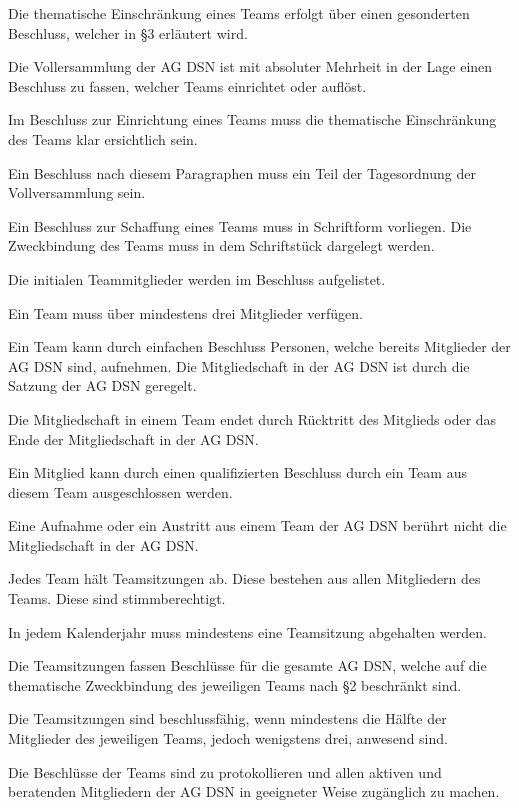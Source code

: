 \documentclass[draft,parskip=half-,DIV=12,mpinclude]{scrartcl}
\begin{document}
\begin{contract}
Die thematische Einschränkung eines Teams erfolgt über einen gesonderten Beschluss, welcher in §3 erläutert wird.


Die Vollersammlung der AG DSN ist mit absoluter Mehrheit in der Lage einen Beschluss zu fassen, welcher Teams einrichtet oder auflöst.

Im Beschluss zur Einrichtung eines Teams muss die thematische Einschränkung des Teams klar ersichtlich sein.

Ein Beschluss nach diesem Paragraphen muss ein Teil der Tagesordnung der Vollversammlung sein.

Ein Beschluss zur Schaffung eines Teams muss in Schriftform vorliegen. Die Zweckbindung des Teams muss in dem Schriftstück dargelegt werden.

Die initialen Teammitglieder werden im Beschluss aufgelistet.

Ein Team muss über mindestens drei Mitglieder verfügen.


Ein Team kann durch einfachen Beschluss Personen, welche bereits Mitglieder der AG DSN sind, aufnehmen. Die Mitgliedschaft in der AG DSN ist durch die Satzung der AG DSN geregelt.

Die Mitgliedschaft in einem Team endet durch Rücktritt des Mitglieds oder das Ende der Mitgliedschaft in der AG DSN.

Ein Mitglied kann durch einen qualifizierten Beschluss durch ein Team aus diesem Team ausgeschlossen werden.

Eine Aufnahme oder ein Austritt aus einem Team der AG DSN berührt nicht die Mitgliedschaft in der AG DSN.


Jedes Team hält Teamsitzungen ab. Diese bestehen aus allen Mitgliedern des Teams. Diese sind stimmberechtigt.

In jedem Kalenderjahr muss mindestens eine Teamsitzung abgehalten werden.

Die Teamsitzungen fassen Beschlüsse für die gesamte AG DSN, welche auf die thematische Zweckbindung des jeweiligen Teams nach §2 beschränkt sind.

Die Teamsitzungen sind beschlussfähig, wenn mindestens die Hälfte der Mitglieder des jeweiligen Teams, jedoch wenigstens drei, anwesend sind.

Die Beschlüsse der Teams sind zu protokollieren und allen aktiven und beratenden Mitgliedern der AG DSN in geeigneter Weise zugänglich zu machen.


\end{contract}
\end{document}
